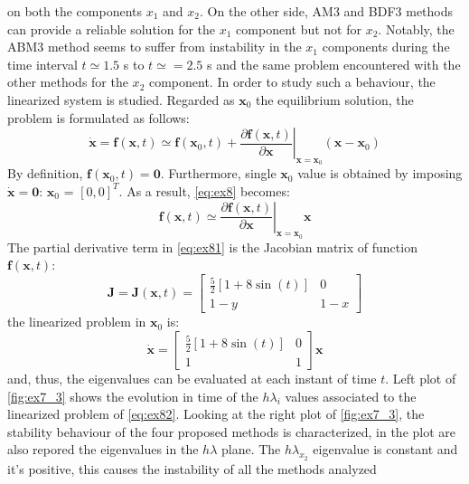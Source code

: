 \documentclass[11pt,a4paper,oneside]{article}
\renewcommand{\vec}[1]{\mathbf{#1}}
\begin{document}
on both the components $x_1$ and $x_2$. On the other side, AM3 and BDF3 methods can provide a reliable 
solution for the $x_1$ component but not for $x_2$. Notably, the ABM3 method seems to suffer from instability 
in the $x_1$ components during the time interval $t\simeq1.5$ s to $t\simeq=2.5$ s and the same problem encountered 
with the other methods for the $x_2$ component.
In order to study such a behaviour, the linearized system is studied. Regarded as $\vec{x}_0$ the 
equilibrium solution, the problem is formulated as follows:
\begin{equation}
    \dot{\vec{x}} = \vec{f}(\vec{x}, t) \simeq \vec{f}(\vec{x}_0, t) + \left.\frac{\partial \vec{f}(\vec{x}, t)}{\partial \vec{x}} \right\rvert_{\vec{x}=\vec{x}_0}(\vec{x}-\vec{x}_0)
    \label{eq:ex8}
\end{equation}
By definition, $\vec{f}(\vec{x}_0,t) = \vec{0}$. Furthermore, single $\vec{x}_0$ value is obtained by imposing $\dot{\vec{x}}=\vec{0}$: $\vec{x}_0$ = $[0, 0]^T$. As a result, \autoref{eq:ex8} becomes:
\begin{equation}
    \vec{f}(\vec{x}, t) \simeq \left.\frac{\partial \vec{f}(\vec{x}, t)}{\partial \vec{x}} \right\rvert_{\vec{x}=\vec{x}_0} \vec{x}
    \label{eq:ex81}
\end{equation}
The partial derivative term in \autoref{eq:ex81} is the Jacobian matrix of function $\vec{f}(\vec{x}, t)$:
\begin{equation}
    \vec{J} = \vec{J}(\vec{x},t) = \begin{bmatrix}
\frac{5}{2}\left[1+8\sin(t)\right] & 0\\
1-y & 1-x
\end{bmatrix}
\end{equation}
the linearized problem in $\vec{x}_0$ is:
\begin{equation}
    \dot{\vec{x}}=\begin{bmatrix}
\frac{5}{2}\left[1+8\sin(t)\right] & 0\\
1 & 1
\end{bmatrix}\vec{x}
\label{eq:ex82}
\end{equation}
and, thus, the eigenvalues can be evaluated at each instant of time $t$.
Left plot of \autoref{fig:ex7_3} shows the evolution in time of the $h\lambda_i$ values associated to the 
linearized problem of \autoref{eq:ex82}. Looking at the right plot of \autoref{fig:ex7_3}, the stability behaviour of 
the four proposed methods is characterized, in the plot are also repored the eigenvalues in the $h\lambda$ plane. 
The $h\lambda_{x_2}$ eigenvalue is constant and it's positive, this causes the instability of all the methods analyzed
\end{document}
